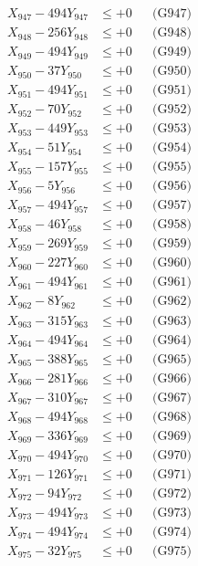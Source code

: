\documentclass[a4paper,10pt]{article}
\begin{document}
{\begin{align}
X_{947} - 494Y_{947} &\leq +0 && \text{(G947)} \\
X_{948} - 256Y_{948} &\leq +0 && \text{(G948)} \\
X_{949} - 494Y_{949} &\leq +0 && \text{(G949)} \\
X_{950} - 37Y_{950} &\leq +0 && \text{(G950)} \\
\allowbreak
X_{951} - 494Y_{951} &\leq +0 && \text{(G951)} \\
X_{952} - 70Y_{952} &\leq +0 && \text{(G952)} \\
X_{953} - 449Y_{953} &\leq +0 && \text{(G953)} \\
X_{954} - 51Y_{954} &\leq +0 && \text{(G954)} \\
X_{955} - 157Y_{955} &\leq +0 && \text{(G955)} \\
X_{956} - 5Y_{956} &\leq +0 && \text{(G956)} \\
X_{957} - 494Y_{957} &\leq +0 && \text{(G957)} \\
X_{958} - 46Y_{958} &\leq +0 && \text{(G958)} \\
X_{959} - 269Y_{959} &\leq +0 && \text{(G959)} \\
X_{960} - 227Y_{960} &\leq +0 && \text{(G960)} \\
\allowbreak
X_{961} - 494Y_{961} &\leq +0 && \text{(G961)} \\
X_{962} - 8Y_{962} &\leq +0 && \text{(G962)} \\
X_{963} - 315Y_{963} &\leq +0 && \text{(G963)} \\
X_{964} - 494Y_{964} &\leq +0 && \text{(G964)} \\
X_{965} - 388Y_{965} &\leq +0 && \text{(G965)} \\
X_{966} - 281Y_{966} &\leq +0 && \text{(G966)} \\
X_{967} - 310Y_{967} &\leq +0 && \text{(G967)} \\
X_{968} - 494Y_{968} &\leq +0 && \text{(G968)} \\
X_{969} - 336Y_{969} &\leq +0 && \text{(G969)} \\
X_{970} - 494Y_{970} &\leq +0 && \text{(G970)} \\
\allowbreak
X_{971} - 126Y_{971} &\leq +0 && \text{(G971)} \\
X_{972} - 94Y_{972} &\leq +0 && \text{(G972)} \\
X_{973} - 494Y_{973} &\leq +0 && \text{(G973)} \\
X_{974} - 494Y_{974} &\leq +0 && \text{(G974)} \\
X_{975} - 32Y_{975} &\leq +0 && \text{(G975)} \\

\end{align}}
\end{document}
